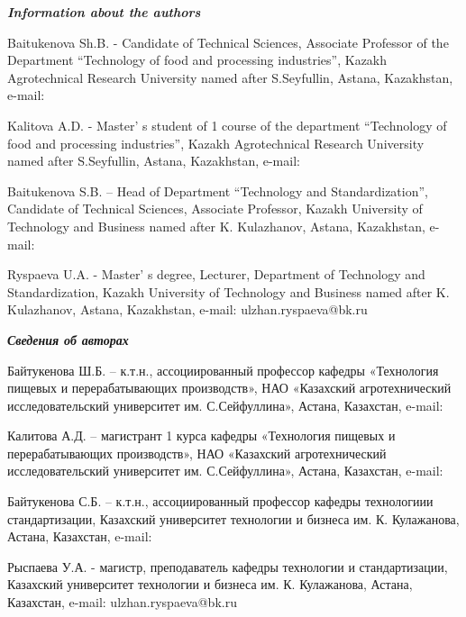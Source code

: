 \begin{authorinfo}
\emph{{\bfseries Information about the authors}}

Baitukenova Sh.B. - Candidate of Technical Sciences, Associate Professor
of the Department ``Technology of food and processing industries'',
Kazakh Agrotechnical Research University named after S.Seyfullin,
Astana, Kazakhstan, e-mail:


Kalitova A.D. - Master' s student of 1 course of the
department ``Technology of food and processing industries'', Kazakh
Agrotechnical Research University named after S.Seyfullin, Astana,
Kazakhstan, e-mail:


Baitukenova S.B. -- Head of Department ``Technology and
Standardization'', Candidate of Technical Sciences, Associate Professor,
Kazakh University of Technology and Business named after K. Kulazhanov,
Astana, Kazakhstan, e-mail:


Ryspaeva U.A. - Master' s degree, Lecturer, Department of
Technology and Standardization, Kazakh University of Technology and
Business named after K. Kulazhanov, Astana, Kazakhstan, e-mail:
ulzhan.ryspaeva@bk.ru

\emph{{\bfseries Сведения об авторах}}

Байтукенова Ш.Б. -- к.т.н., ассоциированный профессор кафедры
«Технология пищевых и перерабатывающих производств», НАО «Казахский
агротехнический исследовательский университет им. С.Сейфуллина», Астана,
Казахстан, e-mail:


Калитова А.Д. -- магистрант 1 курса кафедры «Технология пищевых и
перерабатывающих производств», НАО «Казахский агротехнический
исследовательский университет им. С.Сейфуллина», Астана, Казахстан,
e-mail:


Байтукенова С.Б. -- к.т.н., ассоциированный профессор кафедры
технологиии стандартизации, Казахский университет технологии и бизнеса
им. К. Кулажанова, Астана, Казахстан, e-mail:


Рыспаева У.А. - магистр, преподаватель кафедры технологии и
стандартизации, Казахский университет технологии и бизнеса им. К.
Кулажанова, Астана, Казахстан, e-mail:
ulzhan.ryspaeva@bk.ru
\end{authorinfo}
